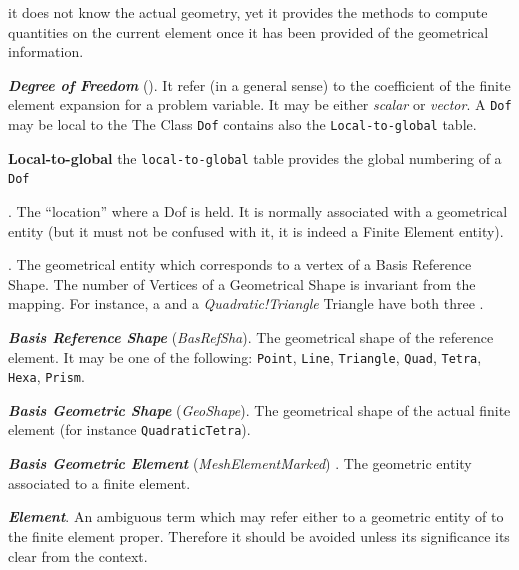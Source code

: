 \begin{description}
  it does not know the actual geometry, yet it provides the methods to
  compute quantities on the current element once it has been provided of
  the geometrical information.
\item \textbf{\emph{Degree of Freedom}}
  (\emph{}).  It refer (in a
  general sense) to the coefficient of the finite element expansion for
  a problem variable. It may be either
  \emph{scalar} or
  \emph{vector}. A \texttt{Dof} may be
  local to the \texttt{} The Class \texttt{Dof}
  contains also the \texttt{Local-to-global} table.
\item \textbf{Local-to-global} the
  \texttt{local-to-global} table provides the global numbering of a \texttt{Dof}
  
\item \textbf{\emph{}}. The ``location'' where a Dof
  is held. It is normally associated with a geometrical entity (but it
  must not be confused with it, it is indeed a Finite Element entity).
  
\item \textbf{\emph{}}. The geometrical entity
  which corresponds to a vertex of a Basis Reference Shape.  The
  number of Vertices of a Geometrical Shape is invariant from the
  mapping. For instance, a \emph{} and a \emph{Quadratic!Triangle}
  Triangle have both three \emph{}.
  
\item \textbf{\emph{Basis Reference Shape}} (\emph{BasRefSha}). The geometrical shape of the reference
  element. It may be one of the following: \texttt{Point},
  \texttt{Line}, \texttt{Triangle}, \texttt{Quad}, \texttt{Tetra},
  \texttt{Hexa}, \texttt{Prism}.
  
\item \textbf{\emph{Basis Geometric Shape}} (\emph{GeoShape}). The geometrical shape of the actual
  finite element (for instance \texttt{QuadraticTetra}).
  
\item \textbf{\emph{Basis Geometric Element}} (\emph{MeshElementMarked})
  . The geometric entity associated to
  a finite element.

\item\textbf{\emph{Element}}. An ambiguous term which may refer either
  to a geometric entity of to the finite element proper. Therefore it
  should be avoided unless its significance its clear from the
  context.
  

\end{description}
